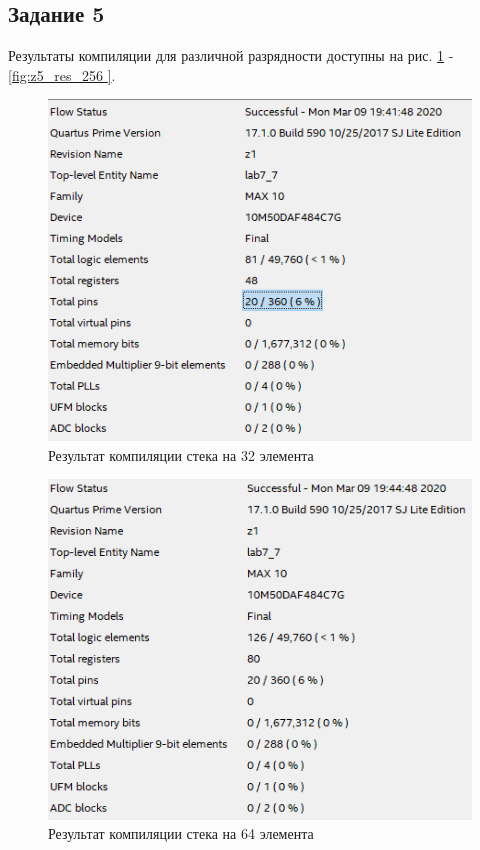 \documentclass[a4paper,14pt]{article}
\begin{document}
	\subsection{Задание 5}
	
	
	
	Результаты компиляции для различной разрядности доступны на рис. \ref{fig:z5_res_32} - \ref{fig:z5_res_256	}.

	\begin{figure}[H]
		\centering
		\includegraphics[width=0.8\linewidth]{images/z5_res_32}
		\caption{Результат компиляции стека на 32 элемента}
		\label{fig:z5_res_32}
	\end{figure}
	
	\begin{figure}[H]
		\centering
		\includegraphics[width=0.8\linewidth]{images/z5_res_64}
		\caption{Результат компиляции стека на 64 элемента}
		\label{fig:z5_res_64}
	\end{figure}
	
\end{document}
